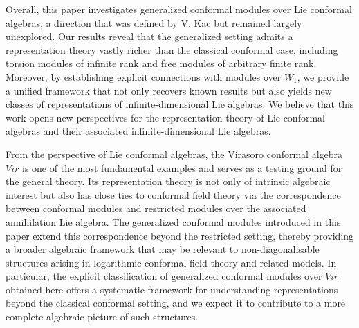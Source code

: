 \documentclass[12pt]{amsart}
\begin{document}
Overall, this paper investigates generalized conformal modules over Lie conformal algebras, a direction that was defined by V. Kac but remained largely unexplored. Our results reveal that the generalized setting admits a representation theory vastly richer than the classical conformal case, including torsion modules of infinite rank and free modules of arbitrary finite rank. Moreover, by establishing explicit connections with modules over $W_1$, we provide a unified framework that not only recovers known results but also yields new classes of representations of infinite-dimensional Lie algebras. We believe that this work opens new perspectives for the representation theory of Lie conformal algebras and their associated infinite-dimensional Lie algebras.

From the perspective of Lie conformal algebras, the Virasoro conformal algebra $Vir$ is one of the most fundamental examples and serves as a testing ground for the general theory. Its representation theory is not only of intrinsic algebraic interest but also has close ties to conformal field theory via the correspondence between conformal modules and restricted modules over the associated annihilation Lie algebra. The generalized conformal modules introduced in this paper extend this correspondence beyond the restricted setting, thereby providing a broader algebraic framework that may be relevant to non-diagonalisable structures arising in logarithmic conformal field theory and related models. In particular, the explicit classification of generalized conformal modules over $Vir$ obtained here offers a systematic framework for understanding representations beyond the classical conformal setting, and we expect it to contribute to a more complete algebraic picture of such structures.
\end{document}
